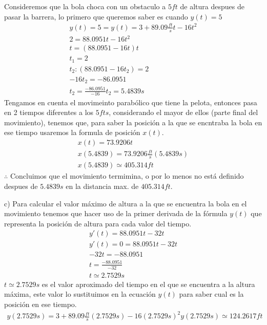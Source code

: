 \documentclass{article}
\begin{document}
    \vspace{5mm} %
    
    Consideremos que la bola choca con un obstaculo a $5ft$ de altura despues de pasar la barrera, lo primero que queremos saber es cuando $y(t)=5$
    \begin{gather*}
        y(t)=5=y(t)=3+89.09\frac{ft}{s}t-16t^2\\
        2=88.0951t-16t^2\\
        t=(88.0951-16t)t\\
        t_1=2\\
        t_2:(88.0951-16t_2)=2\\
        -16t_2=-86.0951\\
        t_2=\frac{-86.0951}{-16}
        t_2=5.4839s
    \end{gather*}
    Tengamos en cuenta el movimeinto parabólico que tiene la pelota, entonces pasa en 2 tiempos diferentes a los $5 fts$, considerando el mayor de ellos (parte final del movimiento), tenemos que, para saber la posición a la que se encntraba la bola en ese tiempo usaremos la formula de posición $x(t)$.
    \begin{gather*}
        x(t)=73.9206t\\
        x(5.4839)=73.9206\frac{ft}{s}(5.4839s)\\
        x(5.4839)\simeq405.314ft
    \end{gather*}
    $\therefore$ Concluimos que el movimiento termimina, o por lo menos no está definido despues de $5.4839s$ en la distancia max. de $405.314ft$.
    
    \vspace{5mm} %
    
    c) Para calcular el valor máximo de altura a la que se encuentra la bola en el movimiento tenemos que hacer uso de la primer derivada de la fórmula $y(t)$ que representa la posición de altura para cada valor del tiempo.
    \begin{gather*}
        y'(t)=88.0951t-32t\\
        y'(t)=0=88.0951t-32t\\
        -32t=-88.0951\\
        t=\frac{-88.0951}{-32}\\
        t\simeq 2.7529s
    \end{gather*}
    $t\simeq 2.7529s$ es el valor aproximado del tiempo en el que se encuentra a la altura máxima, este valor lo sustituimos en la ecuación $y(t)$ para saber cual es la posición en ese tiempo.
    \begin{gather*}
        y(2.7529s)=3+89.09\frac{ft}{s}(2.7529s)-16(2.7529s)^2
        y(2.7529s)\simeq 124.2617ft
    \end{gather*}
\end{document}
